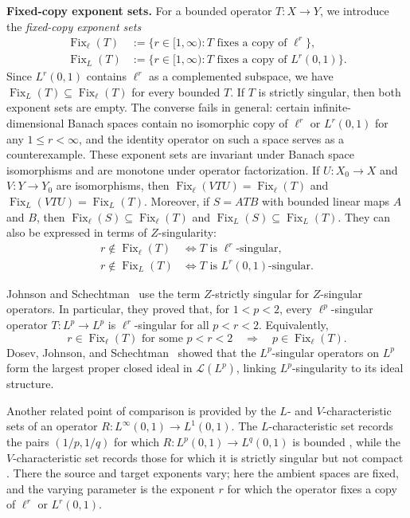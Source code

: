 \documentclass[10pt,a4paper]{amsart}
\begin{document}
 
\medskip\noindent\textbf{Fixed-copy exponent sets.}
For a bounded operator \(T:X\to Y\), we introduce the
\emph{fixed-copy exponent sets}
\[
\begin{aligned}
\operatorname{Fix}_\ell(T)
&:=
\{r\in[1,\infty):T\text{ fixes a copy of }\ell^r\},\\
\operatorname{Fix}_L(T)
&:=
\{r\in[1,\infty):T\text{ fixes a copy of }L^r(0,1)\}.
\end{aligned}
\]
Since \(L^r(0,1)\) contains \(\ell^r\) as a complemented subspace,
we have
\(\operatorname{Fix}_{L}(T)\subseteq\operatorname{Fix}_{\ell}(T)\)
for every bounded \(T\). If \(T\) is strictly singular, then both exponent sets are empty.
The converse fails in general: certain infinite-dimensional Banach
spaces contain no isomorphic copy of \(\ell^r\) or \(L^r(0,1)\) for
any \(1\le r<\infty\), and the identity operator on such a space
serves as a counterexample.
These exponent sets are invariant under Banach space isomorphisms and
are monotone under operator factorization.
If \(U:X_0\to X\) and \(V:Y\to Y_0\) are isomorphisms, then
\(\operatorname{Fix}_{\ell}(VTU)=\operatorname{Fix}_{\ell}(T)\) and
\(\operatorname{Fix}_{L}(VTU)=\operatorname{Fix}_{L}(T)\).
Moreover, if \(S=ATB\) with bounded linear maps \(A\) and \(B\), then
\(\operatorname{Fix}_{\ell}(S)\subseteq\operatorname{Fix}_{\ell}(T)\)
and
\(\operatorname{Fix}_{L}(S)\subseteq\operatorname{Fix}_{L}(T)\). They can also be expressed in
terms of \(Z\)-singularity:
\[
\begin{aligned}
r\notin\operatorname{Fix}_{\ell}(T)
&\Longleftrightarrow
T\text{ is }\ell^r\text{-singular},\\
r\notin\operatorname{Fix}_{L}(T)
&\Longleftrightarrow
T\text{ is }L^r(0,1)\text{-singular}.
\end{aligned}
\]


Johnson and Schechtman~\cite{JohnsonSchechtman2008} use the term
\(Z\)-strictly singular for \(Z\)-singular operators. In particular,
they proved that, for \(1<p<2\), every \(\ell^p\)-singular operator
\(T:L^p\to L^p\) is \(\ell^r\)-singular for all \(p<r<2\).
Equivalently,
\[
        r\in\operatorname{Fix}_{\ell}(T)
        \text{ for some }p<r<2
        \quad\Longrightarrow\quad
        p\in\operatorname{Fix}_{\ell}(T).
\]
Dosev, Johnson, and Schechtman~\cite{DosevJohnsonSchechtman2013}
showed that the \(L^p\)-singular operators on \(L^p\) form the largest
proper closed ideal in \(\mathcal L(L^p)\), linking
\(L^p\)-singularity to its ideal structure.

Another related point of comparison is provided by the
\(L\)- and \(V\)-characteristic sets of an operator
\(R:L^\infty(0,1)\to L^1(0,1)\).
The \(L\)-characteristic set records the pairs \((1/p,1/q)\) for which
\(R:L^p(0,1)\to L^q(0,1)\) is bounded
\cite{HernandezSemenovTradacete2017}, while the
\(V\)-characteristic set records those for which it is strictly
singular but not compact
\cite{HernandezSemenovTradacete2017,
HernandezSemenovTradacete2023}.
There the source and target exponents vary; here the ambient spaces
are fixed, and the varying parameter is the exponent \(r\) for which
the operator fixes a copy of \(\ell^r\) or \(L^r(0,1)\).
\end{document}
